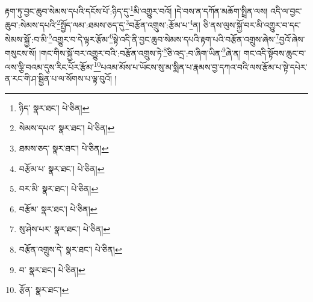 རྟག་ཏུ་བྱང་ཆུབ་སེམས་དཔའི་དངོས་པོ་:ཉིད་དུ་\footnote{ཉིད་  སྣར་ཐང་།  པེ་ཅིན། }མི་འགྱུར་བའོ། །དེ་བས་ན་དཀོན་མཆོག་སྤྲིན་ལས། འདི་ལ་བྱང་ཆུབ་:སེམས་དཔའི་\footnote{སེམས་དཔའ་  སྣར་ཐང་།  པེ་ཅིན། }སྤྱོད་ལམ་:ཐམས་ཅད་དུ་\footnote{ཐམས་ཅད་  སྣར་ཐང་།  པེ་ཅིན། }བརྩོན་འགྲུས་:རྩོམ་པ་\footnote{བརྩོམ་པ་  སྣར་ཐང་།  པེ་ཅིན། }ན། ཅི་ནས་ལུས་སྐྱོ་བར་མི་འགྱུར་བ་དང་སེམས་སྐྱོ་:བ་མི་\footnote{བར་མི་  སྣར་ཐང་།  པེ་ཅིན། }འགྱུར་བ་དེ་ལྟར་རྩོམ་\footnote{བརྩོམ་  སྣར་ཐང་།  པེ་ཅིན། }སྟེ་འདི་ནི་བྱང་ཆུབ་སེམས་དཔའི་རྟག་པའི་བརྩོན་འགྲུས་ཞེས་\footnote{སུ་ཤེས་པར་  སྣར་ཐང་།  པེ་ཅིན། }བྱའོ་ཞེས་གསུངས་སོ། །གང་གིས་སྐྱོ་བར་འགྱུར་བའི་:བརྩོན་འགྲུས་ཏེ་\footnote{བརྩོན་འགྲུས་དེ་  སྣར་ཐང་།  པེ་ཅིན། }ཅི་འདྲ་:བ་ཞིག་ཡིན་\footnote{བ་  སྣར་ཐང་།  པེ་ཅིན། }ཞེ་ན། གང་འདི་སྟོབས་ཆུང་བ་ལས་ལྕི་བའམ་དུས་རིང་པོར་རྩོམ་\footnote{རྩོན་  སྣར་ཐང་། }པའམ་མོས་པ་ཡོངས་སུ་མ་སྨིན་པ་རྣམས་བྱ་དཀའ་བའི་ལས་རྩོམ་པ་སྟེ་དཔེར་ན་རང་གི་ཤ་སྦྱིན་པ་ལ་སོགས་པ་ལྟ་བུའོ། །
